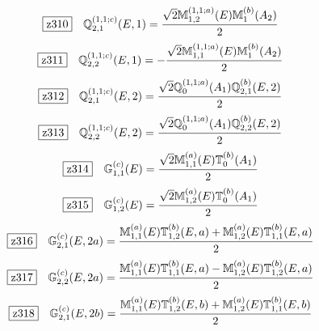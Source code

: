 \documentclass[fleqn,10pt,landscape]{jsarticle}
\begin{document}
\begin{dmath*}
\hspace*{3mm}\fbox{z310}\quad \mathbb{Q}_{2,1}^{(1,1;c)}(E,1)=\frac{\sqrt{2} \mathbb{M}_{1,2}^{(1,1;a)}(E) \mathbb{M}_{1}^{(b)}(A_{2})}{2}
\end{dmath*}
\begin{dmath*}
\hspace*{3mm}\fbox{z311}\quad \mathbb{Q}_{2,2}^{(1,1;c)}(E,1)=- \frac{\sqrt{2} \mathbb{M}_{1,1}^{(1,1;a)}(E) \mathbb{M}_{1}^{(b)}(A_{2})}{2}
\end{dmath*}
\begin{dmath*}
\hspace*{3mm}\fbox{z312}\quad \mathbb{Q}_{2,1}^{(1,1;c)}(E,2)=\frac{\sqrt{2} \mathbb{Q}_{0}^{(1,1;a)}(A_{1}) \mathbb{Q}_{2,1}^{(b)}(E,2)}{2}
\end{dmath*}
\begin{dmath*}
\hspace*{3mm}\fbox{z313}\quad \mathbb{Q}_{2,2}^{(1,1;c)}(E,2)=\frac{\sqrt{2} \mathbb{Q}_{0}^{(1,1;a)}(A_{1}) \mathbb{Q}_{2,2}^{(b)}(E,2)}{2}
\end{dmath*}
\begin{dmath*}
\hspace*{3mm}\fbox{z314}\quad \mathbb{G}_{1,1}^{(c)}(E)=\frac{\sqrt{2} \mathbb{M}_{1,1}^{(a)}(E) \mathbb{T}_{0}^{(b)}(A_{1})}{2}
\end{dmath*}
\begin{dmath*}
\hspace*{3mm}\fbox{z315}\quad \mathbb{G}_{1,2}^{(c)}(E)=\frac{\sqrt{2} \mathbb{M}_{1,2}^{(a)}(E) \mathbb{T}_{0}^{(b)}(A_{1})}{2}
\end{dmath*}
\begin{dmath*}
\hspace*{3mm}\fbox{z316}\quad \mathbb{G}_{2,1}^{(c)}(E,2a)=\frac{\mathbb{M}_{1,1}^{(a)}(E) \mathbb{T}_{1,2}^{(b)}(E,a) + \mathbb{M}_{1,2}^{(a)}(E) \mathbb{T}_{1,1}^{(b)}(E,a)}{2}
\end{dmath*}
\begin{dmath*}
\hspace*{3mm}\fbox{z317}\quad \mathbb{G}_{2,2}^{(c)}(E,2a)=\frac{\mathbb{M}_{1,1}^{(a)}(E) \mathbb{T}_{1,1}^{(b)}(E,a) - \mathbb{M}_{1,2}^{(a)}(E) \mathbb{T}_{1,2}^{(b)}(E,a)}{2}
\end{dmath*}
\begin{dmath*}
\hspace*{3mm}\fbox{z318}\quad \mathbb{G}_{2,1}^{(c)}(E,2b)=\frac{\mathbb{M}_{1,1}^{(a)}(E) \mathbb{T}_{1,2}^{(b)}(E,b) + \mathbb{M}_{1,2}^{(a)}(E) \mathbb{T}_{1,1}^{(b)}(E,b)}{2}
\end{dmath*}
\end{document}
